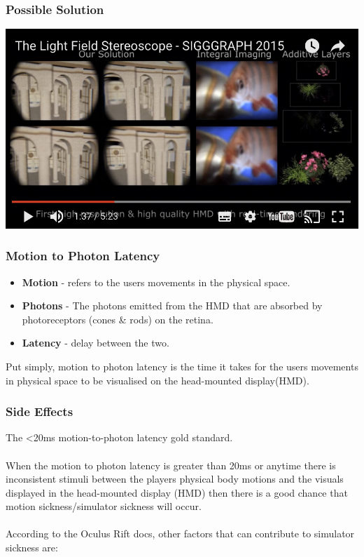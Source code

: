 \begin{frame}
	\frametitle{Possible Solution}
	\begin{center}
		\href{https://www.youtube.com/watch?v=YJdMPUF8cDM}{ \includegraphics[scale=.55]{assets/lightfield}  }
	\end{center}

\end{frame}

\begin{frame}
	\frametitle{Motion to Photon Latency}
	\begin{itemize}
		\item \textbf{Motion} - refers to the users movements in the physical space.
		\item \textbf{Photons} - The photons emitted from the HMD that are absorbed by photoreceptors (cones \& rods) on the retina.
		\item \textbf{Latency} - delay between the two. 
	\end{itemize}
	
		Put simply, motion to photon latency is the time it takes for the users movements in physical space to be visualised on the head-mounted display(HMD).
	
\end{frame}

\begin{frame}
	\frametitle{Side Effects}
	The \textless20ms motion-to-photon latency gold standard. \\~\\
	
	When the motion to photon latency is greater than 20ms or anytime there is inconsistent stimuli between the players physical body motions and the visuals displayed in the head-mounted display (HMD) then there is a good chance that motion sickness/simulator sickness will occur. \\~\\

	According to the Oculus Rift docs, other factors that can contribute to simulator sickness are:

\end{frame}

